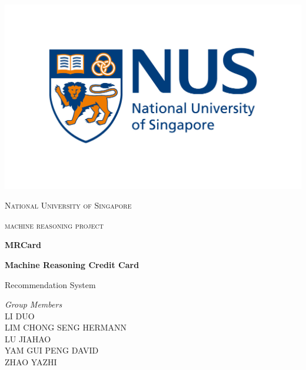 \begin{titlepage}


\thispagestyle{empty}
\setlength\headheight{0pt}
\begin{center}

\begin{center}
\includegraphics[width=0.8\linewidth]{img/NUS_logo.jpg}
\end{center}

        {\scshape\LARGE National University of Singapore \par}
        \vspace{0.25cm}
        {\scshape\Large machine reasoning project\par}
        \vspace{0.5cm}

        {\Large\bfseries MRCard}

        {\large\bfseries Machine Reasoning Credit Card \par Recommendation System}

        \vspace{0.5cm}

        \begin{minipage}{0.6\textwidth}
    		\begin{flushleft} \large
    			\emph{Group Members}\\
                LI DUO\\
                LIM CHONG SENG HERMANN\\
                LU JIAHAO\\
                YAM GUI PENG DAVID\\
                ZHAO YAZHI\\
    		\end{flushleft}
		\end{minipage}~
			\begin{minipage}{0.2\textwidth}


\end{minipage}
\end{center}
\end{titlepage}
